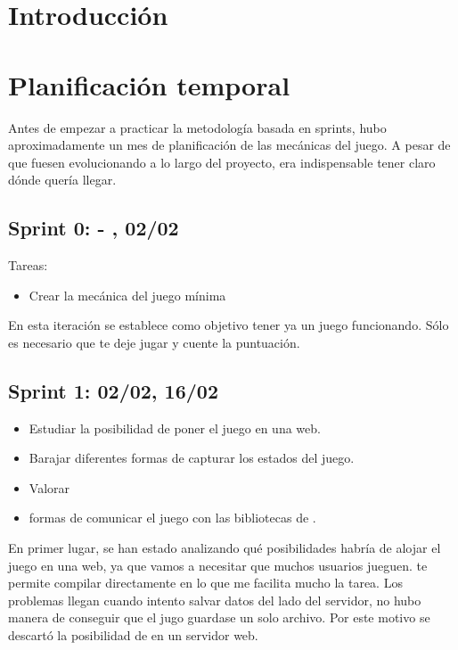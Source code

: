 
\section{Introducción}



\section{Planificación temporal}

Antes de empezar a practicar la metodología basada en sprints, hubo aproximadamente un mes de planificación de las mecánicas del juego. A pesar de que fuesen evolucionando a lo largo del proyecto, era indispensable tener claro dónde quería llegar.


\subsection{Sprint 0:  - , 02/02 }
Tareas:
\begin{itemize}
    \item Crear la mecánica del juego mínima
\end{itemize}


En esta iteración se establece como objetivo tener ya un juego funcionando. Sólo es necesario que te deje jugar y cuente la puntuación.

\subsection{Sprint 1:  02/02, 16/02}

\begin{itemize}
     \item Estudiar la posibilidad de poner el juego en una web. 
     \item Barajar diferentes formas de capturar los estados del juego. \item Valorar \item formas de comunicar el juego con las bibliotecas de .
\end{itemize}

En primer lugar, se han estado analizando qué posibilidades habría de alojar el juego en una web, ya que vamos a necesitar que muchos usuarios jueguen.  te permite compilar directamente en  lo que me facilita mucho la tarea. Los problemas llegan cuando intento salvar datos del lado del servidor, no hubo manera de conseguir que el jugo guardase un solo archivo. Por este motivo se descartó la posibilidad de  en un servidor web.

